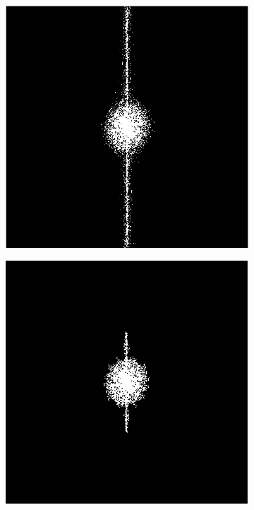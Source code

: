 \documentclass{article}
\begin{document}
\begin{figure}[H]
\begin{subfigure}[b]{0.32\textwidth}
		\caption{}
		\label{fig:step2lpf}
	\end{subfigure}%
	\hspace{\fill}
	\begin{subfigure}[b]{0.32\textwidth}
		\includegraphics[width=\linewidth]{step3}
		\caption{}
		\label{fig:step3lpf}
	\end{subfigure}%
	\hspace{\fill}
	\begin{subfigure}[b]{0.32\textwidth}
		\includegraphics[width=\linewidth]{step4}

\end{subfigure}
\end{figure}
\end{document}
